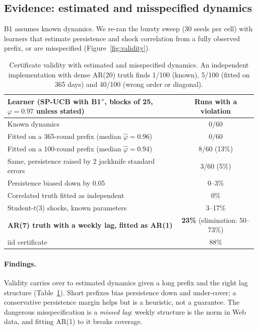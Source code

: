 \documentclass[11pt]{article}
\theoremstyle{definition}
\theoremstyle{remark}
\begin{document}
\subsection{Evidence: estimated and misspecified dynamics}

B1 assumes known dynamics. We re-ran the bursty sweep (30 seeds per cell) with learners that estimate persistence and shock correlation from a fully observed prefix, or are misspecified (Figure~\ref{fig:validity}).

\begin{table}[t]\centering\small
\begin{tabular}{lc}
\toprule
Learner (SP-UCB with B1$''$, blocks of 25, $\varphi=0.97$ unless stated) & Runs with a violation \\
\midrule
Known dynamics & 0/60 \\
Fitted on a 365-round prefix (median $\hat\varphi=0.96$) & 0/60 \\
Fitted on a 100-round prefix (median $\hat\varphi=0.94$) & 8/60 (13\%) \\
Same, persistence raised by 2 jackknife standard errors & 3/60 (5\%) \\
Persistence biased down by 0.05 & 0--3\% \\
Correlated truth fitted as independent & 0\% \\
Student-$t$(3) shocks, known parameters & 3--17\% \\
\textbf{AR(7) truth with a weekly lag, fitted as AR(1)} & \textbf{23\%} (elimination: 50--73\%) \\
iid certificate & 88\% \\
\bottomrule
\end{tabular}
\caption{Certificate validity with estimated and misspecified dynamics. An independent implementation with dense AR(20) truth finds 1/100 (known), 5/100 (fitted on 365 days) and 40/100 (wrong order or diagonal).}\label{tab:robust}
\end{table}

\paragraph{Findings.} Validity carries over to estimated dynamics given a long prefix and the right lag structure (Table~\ref{tab:robust}). Short prefixes bias persistence down and under-cover; a conservative persistence margin helps but is a heuristic, not a guarantee. The dangerous misspecification is a \emph{missed lag}: weekly structure is the norm in Web data, and fitting AR(1) to it breaks coverage.
\end{document}
